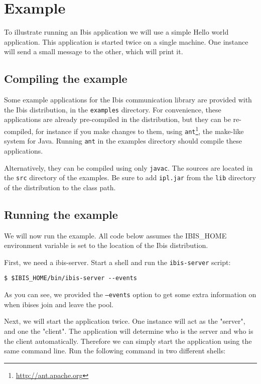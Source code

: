 \documentclass[10pt]{article}
\begin{document}
\section{Example}

To illustrate running an Ibis application we will use a simple Hello
world application. This application is started twice on a single
machine. One instance will send a small message to the other, which will
print it.

\subsection{Compiling the example}

Some example applications for the Ibis communication library are
provided with the Ibis distribution, in the \texttt{examples} directory.
For convenience, these applications are already pre-compiled in the
distribution, but they can be re-compiled, for instance if you make
changes to them, using \texttt{ant}\footnote{\url{http://ant.apache.org}}, the
make-like system for Java. Running \texttt{ant} in the examples
directory should compile these applications. 

Alternatively, they can be compiled using only \texttt{javac}. The sources are
located in the \texttt{src} directory of the examples. Be sure to add
\texttt{ipl.jar} from the \texttt{lib} directory of the distribution to
the class path.

\subsection{Running the example}

We will now run the example. All code below assumes the IBIS\_HOME
environment variable is set to the location of the Ibis distribution.

First, we need a ibis-server. Start a shell and
run the \texttt{ibis-server} script:
\noindent
{\small
\begin{verbatim}
$ $IBIS_HOME/bin/ibis-server --events
\end{verbatim}
}
\noindent

As you can see, we provided the \texttt{--events} option to get some
extra information on when ibises join and leave the pool.

Next, we will start the application twice. One instance will act as the
"server", and one the "client". The application will determine who is
the server and who is the client automatically. Therefore we can simply
start the application using the same command line. Run the following
command in two different shells:
\end{document}
